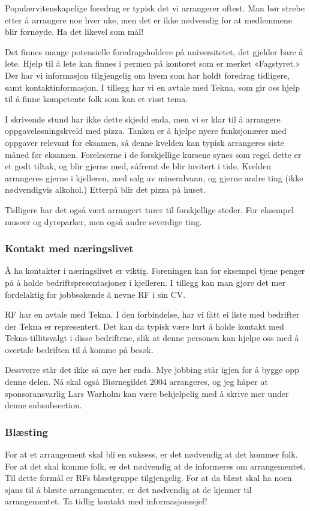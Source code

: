 Populærvitenskapelige foredrag er typisk det vi arrangerer oftest. Man
bør strebe etter å arrangere noe hver uke, men det er ikke nødvendig for
at medlemmene blir fornøyde. Ha det likevel som mål!

Det finnes mange potensielle foredragsholdere på universitetet, det gjelder bare
å lete. Hjelp til å lete kan finnes i permen på kontoret som er merket
«Fagstyret.» Der har vi informasjon tilgjengelig om hvem som har holdt 
foredrag tidligere, samt kontaktinformasjon.
I tillegg har vi en avtale med Tekna, som gir oss
hjelp til å finne kompetente folk som kan et visst tema. 

I skrivende stund har ikke dette skjedd enda, men vi er klar til å arrangere
oppgaveløsningskveld med pizza. Tanken er å hjelpe nyere funksjonærer med
oppgaver relevant for eksamen, så denne kvelden kan typisk arrangeres siste
måned før eksamen. Foreleserne i de forskjellige kursene synes som regel
dette er et godt tiltak, og blir gjerne med, såfremt de blir invitert i tide.
Kvelden arrangeres gjerne i kjelleren, med salg av mineralvann, og gjerne
andre ting (ikke nødvendigvis alkohol.) Etterpå blir det pizza på huset.

Tidligere har det også vært arrangert turer til forskjellige steder. For
eksempel museer og dyreparker, men også andre severdige ting.

\subsubsection{Kontakt med næringslivet}
Å ha kontakter i næringslivet er viktig. Foreningen kan for eksempel tjene
penger på å holde bedriftspresentasjoner i kjelleren. I tillegg kan man gjøre
det mer fordelaktig for jobbsøkende å nevne RF i sin CV.

RF har en avtale med Tekna. I den forbindelse, har vi fått ei liste med bedrifter
der Tekna er representert. Det kan da typisk være lurt å holde kontakt med
Tekna-tillitsvalgt i disse bedriftene, slik at denne personen kan hjelpe oss
med å overtale bedriften til å komme på besøk.

Dessverre står det ikke så mye her enda. Mye jobbing står igjen for å bygge opp
denne delen. Nå skal også Biørnegildet 2004 arrangeres, og jeg håper at
sponsoransvarlig Lars Warholm kan være behjelpelig med å skrive mer under
denne subsubsection.

\subsubsection{Blæsting}
For at et arrangement skal bli en suksess, er det nødvendig at det kommer
folk. For at det skal komme folk, er det nødvendig at de informeres om
arrangementet. Til dette formål er RFs blæstgruppe tilgjengelig. For
at da blæst skal ha noen sjans til å blæste arrangementer, er det nødvendig
at de kjenner til arrangementet. Ta tidlig kontakt med informasjonssjef!

